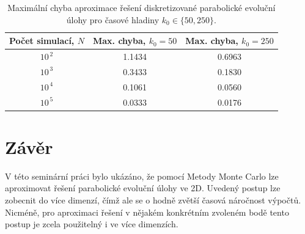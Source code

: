 \documentclass[11pt,american,czech]{article}
\begin{document}
{\renewcommand{\arraystretch}{1.5}
\begin{table}[H]
\centering
	\begin{tabular}{ |c||c|c| }
		\hline
		Počet simulací, $N$ & Max. chyba, $k_{0}=50$ & Max. chyba, $k_{0}=250$ \\ \hline\hline
		$10^{\,2}$ & 1.1434 & 0.6963 \\ \hline
		$10^{\,3}$ & 0.3433 & 0.1830 \\ \hline
		$10^{\,4}$ & 0.1061 & 0.0560 \\ \hline
		$10^{\,5}$ & 0.0333 & 0.0176 \\ \hline
	\end{tabular}
	\caption{Maximální chyba aproximace řešení diskretizované parabolické evoluční úlohy pro časové hladiny $k_{0}\in\{50,250\}$.}
	\label{tab:error}
\end{table}

\section{Závěr}

V této seminární práci bylo ukázáno, že pomocí Metody Monte Carlo lze aproximovat řešení parabolické evoluční úlohy ve 2D. Uvedený postup lze zobecnit do více dimenzí, čímž ale se o hodně zvětší časová náročnost výpočtů. Nicméně, pro aproximaci řešení v nějakém konkrétním zvoleném bodě tento postup je zcela použitelný i ve více dimenzích. 

\newpage{}


\begin{figure}[H]
\hfill
{}
\end{figure}

}
\end{document}
